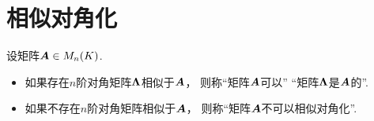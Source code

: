 \section{相似对角化}
\begin{definition}\label{definition:相似对角化.相似对角化}
设矩阵\(\boldsymbol{A} \in M_n(K)\).
\begin{itemize}
	\item 如果存在\(n\)阶对角矩阵\(\boldsymbol\Lambda\)相似于\(\boldsymbol{A}\)，
	则称“矩阵\(\boldsymbol{A}\)可以”
	“矩阵\(\boldsymbol\Lambda\)是\(\boldsymbol{A}\)的”.
	\item 如果不存在\(n\)阶对角矩阵相似于\(\boldsymbol{A}\)，
	则称“矩阵\(\boldsymbol{A}\)不可以{相似对角化}”.
\end{itemize}
\end{definition}


